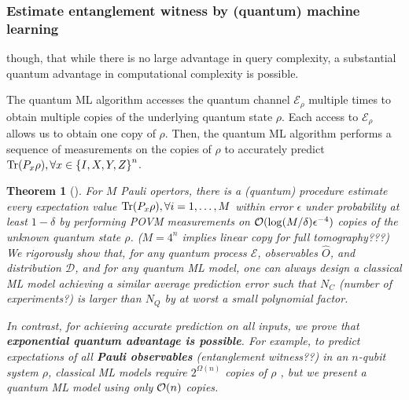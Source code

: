\documentclass[
aps,
pra,
floatfix,
]{revtex4-2}
\theoremstyle{plain}
\newtheorem{theorem}{Theorem}
\theoremstyle{definition}
\newcommand{\ob}{\hat{O}}
\newcommand{\dm}{\rho}
\begin{document}
\subsubsection{Estimate entanglement witness by (quantum) machine learning}
though, that while there is no large advantage in query complexity, a substantial quantum advantage in computational complexity is possible.

The quantum ML algorithm accesses the quantum channel $\mathcal{E}_\dm$ multiple times to obtain multiple copies of the underlying quantum state $\dm$. Each access to $\mathcal{E}_\dm$ allows us to obtain one copy of $\dm$. Then, the quantum ML algorithm performs a sequence of measurements on the copies of $\dm$ to accurately predict $\Tr(P_x \dm ), \forall x \in \qty{ I, X, Y, Z }^n$.

\begin{theorem}[\cite{huangInformationtheoreticBoundsQuantum2021}]\label{thm:quantum_ml_estimate_bound}
	For $M$ Pauli opertors, there is a (quantum) procedure estimate every expectation value $\Tr(P_x \dm),\forall i=1,\dots,M$ within error $\epsilon$ under probability at least $1-\delta $ by performing POVM measurements on $\mathcal{O}(\log(M/\delta)\epsilon^{-4})$ copies of the unknown quantum state $\dm$.
	($M=4^n$ implies linear copy for full tomography???)
	We rigorously show that, for any quantum process $\mathcal{E}$, observables $\ob$, and distribution $\mathcal{D}$, and for any quantum ML model, one can always design a classical ML model achieving a similar average prediction error such that $N_C$ (number of experiments?) is larger than $N_Q$ by at worst a small polynomial factor.

	In contrast, for achieving accurate prediction on all inputs, we prove that \textbf{exponential quantum advantage is possible}. For example, to predict expectations of all \textbf{Pauli observables} (entanglement witness??) in an $n$-qubit system $\dm$, classical ML models require $2^{\Omega(n)}$ copies of $\dm$ , but we present a quantum ML model using only $\mathcal{O}(n)$ copies.
\end{theorem}
\cite{huangPredictingManyProperties2020}
\cite{huangInformationtheoreticBoundsQuantum2021}
\cite{huangPowerDataQuantum2021}
\cite{aaronsonShadowTomographyQuantum2018}
\end{document}
